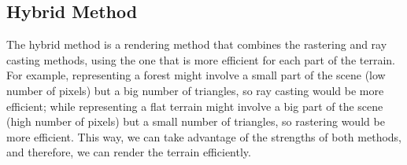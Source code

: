 \subsection{Hybrid Method}

The hybrid method is a rendering method that combines the rastering and ray casting methods, using the one that is more efficient for each part of the terrain. For example, representing a forest might involve a small part of the scene (low number of pixels) but a big number of triangles, so ray casting would be more efficient; while representing a flat terrain might involve a big part of the scene (high number of pixels) but a small number of triangles, so rastering would be more efficient. This way, we can take advantage of the strengths of both methods, and therefore, we can render the terrain efficiently.